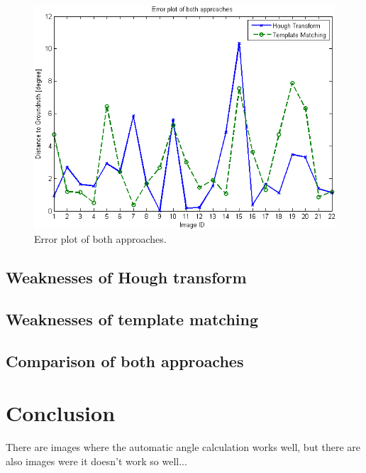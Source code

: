 \documentclass[10pt,twocolumn,letterpaper]{article}
\begin{document}
\begin{figure}
	\begin{center}		
		\includegraphics[width=1\linewidth]{img/errorPlot2}
	\end{center}
	\caption{Error plot of both approaches.}
	\label{fig:errorPlot}
	
\end{figure}

\subsection{Weaknesses of Hough transform}

\subsection{Weaknesses of template matching}

\subsection{Comparison of both approaches}

\section{Conclusion}
There are images where the automatic angle calculation works well, but there are also images were it doesn't work so well...

{\small


}
\end{document}
